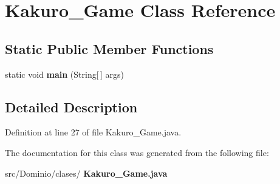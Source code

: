 \section{Kakuro\+\_\+\+Game Class Reference}
\label{class_dominio_1_1clases_1_1_kakuro___game}
\subsection*{Static Public Member Functions}
\begin{DoxyCompactItemize}
\item 
\mbox{\label{class_dominio_1_1clases_1_1_kakuro___game_a8b260eecbaabcef8473fd87ada040682}} 
static void {\bfseries main} (String[$\,$] args)
\end{DoxyCompactItemize}


\subsection{Detailed Description}


Definition at line 27 of file Kakuro\+\_\+\+Game.\+java.



The documentation for this class was generated from the following file\+:\begin{DoxyCompactItemize}
\item 
src/\+Dominio/clases/\textbf{ Kakuro\+\_\+\+Game.\+java}\end{DoxyCompactItemize}
